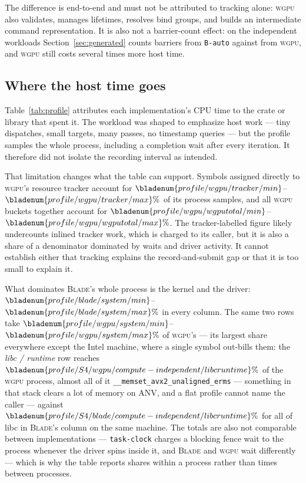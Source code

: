 \documentclass[10pt,twocolumn]{article}
\newcommand{\blade}{\textsc{Blade}}
\newcommand{\wgpu}{\textsc{wgpu}}
\begin{document}
The difference is end-to-end and must not be attributed to tracking alone:
\wgpu{} also validates, manages lifetimes, resolves bind groups, and builds an
intermediate command representation. It is also not a barrier-count effect:
on the independent workloads Section~\ref{sec:generated} counts
 barriers from \texttt{B-auto} against
 from \wgpu, and \wgpu{} still costs
several times more host time.

\subsection{Where the host time goes}
\label{sec:profile}



Table~\ref{tab:profile} attributes each implementation's CPU time to the crate
or library that spent it. The workload was shaped to emphasize host work ---
tiny dispatches, small targets, many passes, no timestamp queries --- but the
profile samples the whole process, including a completion wait after every
iteration. It therefore did not isolate the recording interval as intended.

That limitation changes what the table can support. Symbols assigned directly
to \wgpu's resource tracker account for
$\bladenum{profile/wgpu/tracker/min}$--$\bladenum{profile/wgpu/tracker/max}\%$
of its process samples, and all \wgpu{} buckets together account for
$\bladenum{profile/wgpu/wgputotal/min}$--$\bladenum{profile/wgpu/wgputotal/max}\%$.
The tracker-labelled figure likely undercounts inlined tracker work, which is
charged to its caller, but it is also a share of a denominator dominated by
waits and driver activity. It cannot establish either that tracking explains the
record-and-submit gap or that it is too small to explain it.

What dominates \blade's whole process is the kernel and the driver:
$\bladenum{profile/blade/system/min}$--$\bladenum{profile/blade/system/max}\%$
in every column. The same two rows take
$\bladenum{profile/wgpu/system/min}$--$\bladenum{profile/wgpu/system/max}\%$
of \wgpu's --- its largest share everywhere except the Intel machine, where
a single symbol out-bills them: the \emph{libc / runtime} row reaches
$\bladenum{profile/S4/wgpu/compute-independent/libcruntime}\%$ of the \wgpu{}
process, almost all of it \texttt{\_\_memset\_avx2\_unaligned\_erms} ---
something in that stack clears a lot of memory on ANV, and a flat profile
cannot name the caller --- against
$\bladenum{profile/S4/blade/compute-independent/libcruntime}\%$ for all of
libc in \blade's column on the same machine. The totals are also not
comparable between implementations --- \texttt{task-clock} charges a blocking
fence wait to the process whenever the driver spins inside it, and \blade{}
and \wgpu{} wait differently --- which is why the table reports shares within
a process rather than times between processes.
\end{document}
